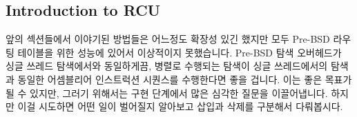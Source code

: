 
\subsection{Introduction to RCU}
\label{sec:defer:Introduction to RCU}

앞의 섹션들에서 이야기된 방법들은 어느정도 확장성 있긴 했지만 모두 Pre-BSD
라우팅 테이블을 위한 성능에 있어서 이상적이지 못했습니다.
Pre-BSD 탐색 오버헤드가 싱글 쓰레드 탐색에서와 동일하게끔, 병렬로 수행되는
탐색이 싱글 쓰레드에서의 탐색과 동일한 어셈블리어 인스트럭션 시퀀스를
수행한다면 좋을 겁니다.
이는 좋은 목표가 될 수 있지만, 그러기 위해서는 구현 단계에서 많은 심각한 질문을
이끌어냅니다.
하지만 이걸 시도하면 어떤 일이 벌어질지 알아보고 삽입과 삭제를 구분해서
다뤄봅시다.

